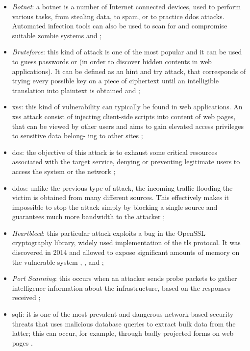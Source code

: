 \begin{itemize}
    \item[\faCaretRight] \textit{Botnet}: a botnet is a number of Internet connected devices, used to perform various tasks, from stealing data, to spam, or to practice \gls{ddos} attacks. Automated infection tools can also be used to scan for and compromise suitable zombie systems \cite{icissp18} and \cite[p.~250]{Sharafaldin2019};
    \item[\faCaretRight] \textit{Bruteforce}: this kind of attack is one of the most popular and it can be used to guess passwords or  (in order to discover hidden contents in web applications). It can be defined as an hint and try attack, that corresponds of trying every possible key on a piece of ciphertext until an intelligible translation into plaintext is obtained \cite{icissp18} and \cite[p.~43]{Sharafaldin2019};
    \item[\faCaretRight] \gls{xss}: this kind of vulnerability can typically be found in web applications. An \gls{xss} attack consist of injecting client-side scripts into  content of web pages, that can be viewed by other users and aims to gain elevated access privileges to sensitive data belong- ing to other sites \cite[p.~387]{Sharafaldin2019};
    \item[\faCaretRight] \gls{dos}: the objective of this attack is to exhaust some critical resources associated with the target service, denying or preventing legitimate users to access the system or the network \cite[p.~241]{Sharafaldin2019};
    \item[\faCaretRight] \gls{ddos}: unlike the previous type of attack, the incoming traffic flooding the victim is obtained from many different sources. This effectively makes it impossible to stop the attack simply by blocking a single source and guarantees much more bandwidth to the attacker \cite[p.~241]{Sharafaldin2019};
    \item[\faCaretRight] \textit{Heartbleed}: this particular attack exploits a bug in the OpenSSL cryptography library, widely used implementation of the \gls{tls} protocol. It was discovered in 2014 and allowed to expose significant amounts of memory on the vulnerable system \cite{Carvalho2014}, \cite{icissp18}, \cite{Stallings2014} and \cite[p.~706]{Sharafaldin2019};
    \item[\faCaretRight] \textit{Port Scanning}: this occurs when an attacker sends probe packets to gather intelligence information about the infrastructure, based on the responses received \cite{icissp18};
    \item[\faCaretRight] \gls{sqli}: it is one of the most prevalent and dangerous network-based security threats that uses malicious database queries to extract bulk data from the latter; this can occur, for example, through badly projected forms on web pages \cite[p.~163]{Sharafaldin2019}.
\end{itemize}
